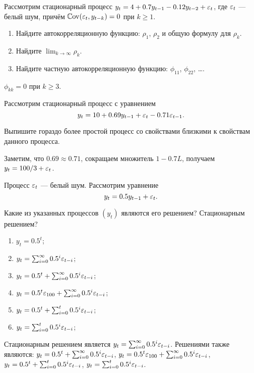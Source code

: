 \begin{problem}
Рассмотрим стационарный процесс $y_t = 4 + 0.7y_{t-1} - 0.12y_{t-2} + \varepsilon_t$, где $\varepsilon_t$ — белый шум, причём $\mathbb{C}\mathrm{ov}(\varepsilon_t, y_{t-k})=0$ при $k \geq 1$.

\begin{enumerate}
  \item Найдите автокорреляционную функцию: $\rho_1$, $\rho_2$ и общую формулу для $\rho_k$.
  \item Найдите $\lim_{k \to \infty} \rho_k$.
  \item Найдите частную автокорреляционную функцию: $\phi_{11}$, $\phi_{22}$, \ldots.
\end{enumerate}
\begin{sol}
  $\phi_{kk}=0$ при $k \geq 3$.
\end{sol}
\end{problem}


\begin{problem}
Рассмотрим стационарный процесс с уравнением
\[
y_t = 10 + 0.69 y_{t-1} + \varepsilon_t - 0.71 \varepsilon_{t-1}.
\]

Выпишите гораздо более простой процесс со свойствами близкими к свойствам данного процесса.
\begin{sol}
Заметим, что $0.69\approx 0.71$, сокращаем множитель $1-0.7L$, получаем $y_t = 100/3 + \varepsilon_t$.
\end{sol}
\end{problem}


\begin{problem}
Процесс $\varepsilon_t$ — белый шум. Рассмотрим уравнение
\[
y_t = 0.5 y_{t-1} + \varepsilon_t.
\]

Какие из указанных процессов $(y_t)$ являются его решением? Стационарным решением?
\begin{enumerate}
  \item $y_t = 0.5^t$;
  \item $y_t = \sum_{i=0}^{\infty} 0.5^i \varepsilon_{t-i}$;
  \item $y_t = 0.5^t + \sum_{i=0}^{\infty} 0.5^i \varepsilon_{t-i}$;
  \item $y_t = 0.5^t\varepsilon_{100} + \sum_{i=0}^{\infty} 0.5^i \varepsilon_{t-i}$;
  \item $y_t = 0.5^t + \sum_{i=0}^{t} 0.5^i \varepsilon_{t-i}$;
  \item $y_t = \sum_{i=0}^{t} 0.5^i \varepsilon_{t-i}$;
\end{enumerate}


\begin{sol}
Стационарным решением является $y_t = \sum_{i=0}^{\infty} 0.5^i \varepsilon_{t-i}$. Решениями также являются: $y_t = 0.5^t + \sum_{i=0}^{\infty} 0.5^i \varepsilon_{t-i}$, $y_t = 0.5^t\varepsilon_{100} + \sum_{i=0}^{\infty} 0.5^i \varepsilon_{t-i}$, $y_t = 0.5^t + \sum_{i=0}^{t} 0.5^i \varepsilon_{t-i}$, $y_t = \sum_{i=0}^{t} 0.5^i \varepsilon_{t-i}$.
\end{sol}
\end{problem}



